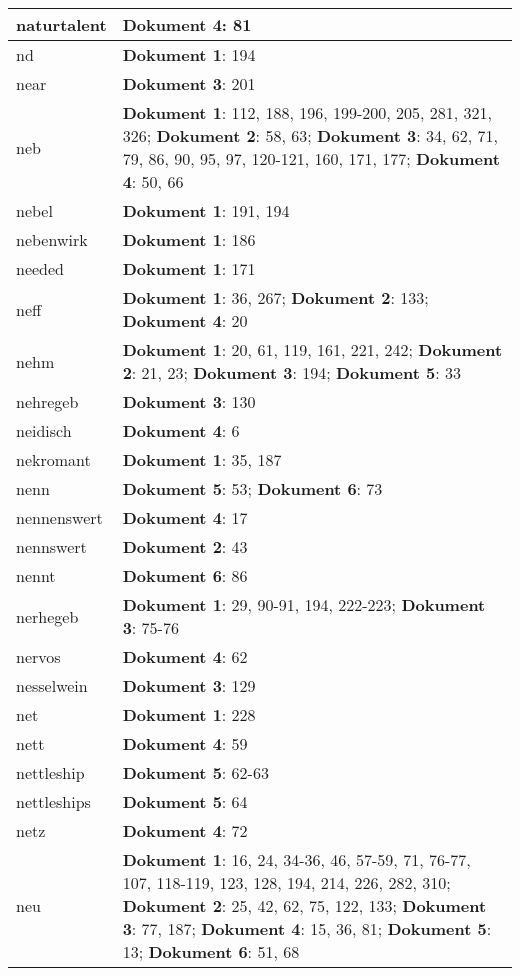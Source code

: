 \documentclass[a5paper]{article}
\begin{document}
\begin{longtable}[l]{|l|p{3in}|}
\hline
naturtalent & \textbf{Dokument 4}: 81 \\
\hline
nd & \textbf{Dokument 1}: 194 \\
\hline
near & \textbf{Dokument 3}: 201 \\
\hline
neb & \textbf{Dokument 1}: 112, 188, 196, 199-200, 205, 281, 321, 326; \textbf{Dokument 2}: 58, 63; \textbf{Dokument 3}: 34, 62, 71, 79, 86, 90, 95, 97, 120-121, 160, 171, 177; \textbf{Dokument 4}: 50, 66 \\
\hline
nebel & \textbf{Dokument 1}: 191, 194 \\
\hline
nebenwirk & \textbf{Dokument 1}: 186 \\
\hline
needed & \textbf{Dokument 1}: 171 \\
\hline
neff & \textbf{Dokument 1}: 36, 267; \textbf{Dokument 2}: 133; \textbf{Dokument 4}: 20 \\
\hline
nehm & \textbf{Dokument 1}: 20, 61, 119, 161, 221, 242; \textbf{Dokument 2}: 21, 23; \textbf{Dokument 3}: 194; \textbf{Dokument 5}: 33 \\
\hline
nehregeb & \textbf{Dokument 3}: 130 \\
\hline
neidisch & \textbf{Dokument 4}: 6 \\
\hline
nekromant & \textbf{Dokument 1}: 35, 187 \\
\hline
nenn & \textbf{Dokument 5}: 53; \textbf{Dokument 6}: 73 \\
\hline
nennenswert & \textbf{Dokument 4}: 17 \\
\hline
nennswert & \textbf{Dokument 2}: 43 \\
\hline
nennt & \textbf{Dokument 6}: 86 \\
\hline
nerhegeb & \textbf{Dokument 1}: 29, 90-91, 194, 222-223; \textbf{Dokument 3}: 75-76 \\
\hline
nervos & \textbf{Dokument 4}: 62 \\
\hline
nesselwein & \textbf{Dokument 3}: 129 \\
\hline
net & \textbf{Dokument 1}: 228 \\
\hline
nett & \textbf{Dokument 4}: 59 \\
\hline
nettleship & \textbf{Dokument 5}: 62-63 \\
\hline
nettleships & \textbf{Dokument 5}: 64 \\
\hline
netz & \textbf{Dokument 4}: 72 \\
\hline
neu & \textbf{Dokument 1}: 16, 24, 34-36, 46, 57-59, 71, 76-77, 107, 118-119, 123, 128, 194, 214, 226, 282, 310; \textbf{Dokument 2}: 25, 42, 62, 75, 122, 133; \textbf{Dokument 3}: 77, 187; \textbf{Dokument 4}: 15, 36, 81; \textbf{Dokument 5}: 13; \textbf{Dokument 6}: 51, 68 \\

\end{longtable}
\end{document}
